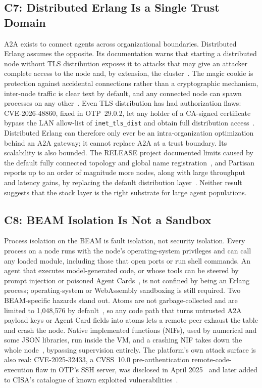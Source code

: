 \documentclass[conference,letterpaper]{IEEEtran}
\newcommand{\code}[1]{\texttt{#1}}
\begin{document}
\subsection{C7: Distributed Erlang Is a Single Trust Domain}

A2A exists to connect agents across organizational boundaries. Distributed
Erlang assumes the opposite. Its documentation warns that starting a
distributed node without TLS distribution exposes it to attacks that may
give an attacker complete access to the node and, by extension, the
cluster~\cite{otp-dist}. The magic cookie is protection against accidental
connections rather than a cryptographic mechanism, inter-node traffic is
clear text by default, and any connected node can spawn processes on any
other~\cite{otp-dist}. Even TLS distribution has had authorization flaws:
CVE-2026-48860, fixed in OTP~29.0.2, let any holder of a CA-signed
certificate bypass the LAN allow-list of \code{inet\_tls\_dist} and obtain
full distribution access~\cite{cve2026-48860,otp2902}. Distributed Erlang
can therefore only ever be an intra-organization optimization behind an A2A
gateway; it cannot replace A2A at a trust boundary. Its scalability is also
bounded. The RELEASE project documented limits caused by the default fully
connected topology and global name registration~\cite{trinder2017}, and
Partisan reports up to an order of magnitude more nodes, along with large
throughput and latency gains, by replacing the default distribution
layer~\cite{meiklejohn2019}. Neither result suggests that the stock layer is
the right substrate for large agent populations.

\subsection{C8: BEAM Isolation Is Not a Sandbox}

Process isolation on the BEAM is fault isolation, not security isolation.
Every process on a node runs with the node's operating-system privileges and
can call any loaded module, including those that open ports or run shell
commands. An agent that executes model-generated code, or whose tools can be
steered by prompt injection or poisoned Agent Cards~\cite{habler2025,
aaif2026}, is not confined by being an Erlang process; operating-system or
WebAssembly sandboxing is still required. Two BEAM-specific hazards stand
out. Atoms are not garbage-collected and are limited to 1{,}048{,}576 by
default~\cite{otp-eff,otp-limits}, so any code path that turns untrusted A2A payload
keys or Agent Card fields into atoms lets a remote peer exhaust the table
and crash the node. Native implemented functions (NIFs), used by numerical
and some JSON libraries, run inside the VM, and a crashing NIF takes down
the whole node~\cite{otp-nif}, bypassing supervision entirely. The
platform's own attack surface is also real: CVE-2025-32433, a CVSS~10.0
pre-authentication remote-code-execution flaw in OTP's SSH server, was
disclosed in April 2025~\cite{cve2025-32433} and later added to CISA's
catalogue of known exploited vulnerabilities~\cite{cve2025-32433-kev}.
\end{document}
